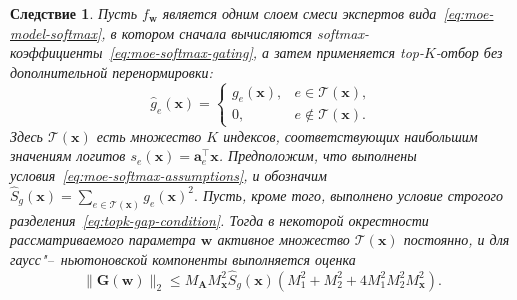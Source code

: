 \documentclass[11pt]{extarticle}
\theoremstyle{definition}
\newcounter{theoremchild}[theorem]
\theoremstyle{plain}
\newtheorem{corollary}[theoremchild]{Следствие}
\theoremstyle{remark}
\begin{document}
\begin{corollary}
\label{cor:moe-postsoftmax-topk-no-renorm}
Пусть $f_{\mathbf w}$ является одним слоем смеси экспертов вида~\eqref{eq:moe-model-softmax}, в котором сначала вычисляются softmax-коэффициенты~\eqref{eq:moe-softmax-gating}, а затем применяется top-$K$-отбор без дополнительной перенормировки:
\begin{equation}
    \label{eq:moe-postsoftmax-topk-no-renorm}
    \hat g_e(\mathbf x)=
    \begin{cases}
        g_e(\mathbf x), & e\in\mathcal T(\mathbf x),\\
        0, & e\notin\mathcal T(\mathbf x).
    \end{cases}
\end{equation}
Здесь $\mathcal T(\mathbf x)$ есть множество $K$ индексов, соответствующих наибольшим значениям логитов $s_e(\mathbf x)=\mathbf a_e^\top\mathbf x$. Предположим, что выполнены условия~\eqref{eq:moe-softmax-assumptions}, и обозначим
$
\hat S_g(\mathbf x)
=
\sum\limits_{e\in\mathcal T(\mathbf x)}
g_e(\mathbf x)^2.
$
Пусть, кроме того, выполнено условие строгого разделения~\eqref{eq:topk-gap-condition}. Тогда в некоторой окрестности рассматриваемого параметра $\mathbf w$ активное множество $\mathcal T(\mathbf x)$ постоянно, и для гаусс"--~ньютоновской компоненты выполняется оценка
\begin{equation}
    \label{eq:moe-postsoftmax-topk-no-renorm-bound}
    \|\mathbf G(\mathbf w)\|_2
    \le
    M_{\mathbf A}M_{\mathbf x}^2\hat S_g(\mathbf x)
    \left(
        M_1^2+M_2^2+4M_1^2M_2^2M_{\mathbf x}^2
    \right).
\end{equation}
\end{corollary}
\end{document}
